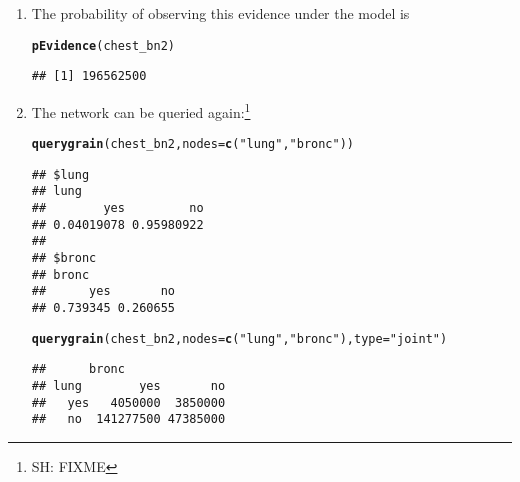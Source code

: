 \documentclass[10pt]{article}\usepackage[]{graphicx}\usepackage[]{color}
\makeatletter
\newcommand{\hlstr}[1]{\textcolor[rgb]{0.192,0.494,0.8}{#1}}%
\newcommand{\hlstd}[1]{\textcolor[rgb]{0.345,0.345,0.345}{#1}}%
\newcommand{\hlkwc}[1]{\textcolor[rgb]{0.333,0.667,0.333}{#1}}%
\newcommand{\hlkwd}[1]{\textcolor[rgb]{0.737,0.353,0.396}{\textbf{#1}}}%
\newenvironment{kframe}{%
 \def\at@end@of@kframe{}%
 \ifinner\ifhmode%
  \def\at@end@of@kframe{\end{minipage}}%
  \begin{minipage}{\columnwidth}%
 \fi\fi%
 \def\FrameCommand##1{\hskip\@totalleftmargin \hskip-\fboxsep
 \colorbox{shadecolor}{##1}\hskip-\fboxsep
     \hskip-\linewidth \hskip-\@totalleftmargin \hskip\columnwidth}%
 \MakeFramed {\advance\hsize-\width
   \@totalleftmargin\z@ \linewidth\hsize
   \@setminipage}}%
 {\par\unskip\endMakeFramed%
 \at@end@of@kframe}
\newenvironment{knitrout}{}{} %
\makeatother
\begin{document}
\begin{enumerate}
\item The probability of observing this evidence under the model is
\begin{knitrout}
\color{fgcolor}\begin{kframe}
\begin{alltt}
\hlkwd{pEvidence}\hlstd{(chest_bn2)}
\end{alltt}
\begin{verbatim}
## [1] 196562500
\end{verbatim}
\end{kframe}
\end{knitrout}

\item The network can be queried again:\footnote{SH: FIXME}
\begin{knitrout}
\color{fgcolor}\begin{kframe}
\begin{alltt}
\hlkwd{querygrain}\hlstd{(chest_bn2,} \hlkwc{nodes}\hlstd{=}\hlkwd{c}\hlstd{(}\hlstr{"lung"}\hlstd{,} \hlstr{"bronc"}\hlstd{))}
\end{alltt}
\begin{verbatim}
## $lung
## lung
##        yes         no 
## 0.04019078 0.95980922 
## 
## $bronc
## bronc
##      yes       no 
## 0.739345 0.260655
\end{verbatim}
\begin{alltt}
\hlkwd{querygrain}\hlstd{(chest_bn2,} \hlkwc{nodes}\hlstd{=}\hlkwd{c}\hlstd{(}\hlstr{"lung"}\hlstd{,} \hlstr{"bronc"}\hlstd{),} \hlkwc{type}\hlstd{=}\hlstr{"joint"}\hlstd{)}
\end{alltt}
\begin{verbatim}
##      bronc
## lung        yes       no
##   yes   4050000  3850000
##   no  141277500 47385000
\end{verbatim}
\end{kframe}
\end{knitrout}
\end{enumerate}
\end{document}
